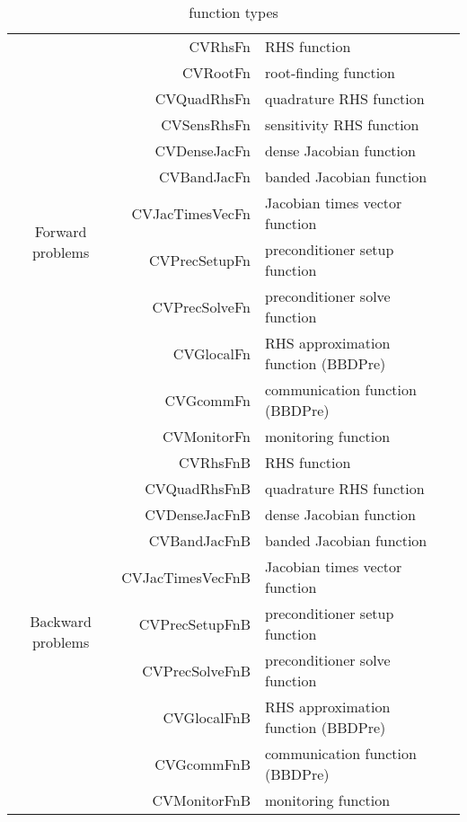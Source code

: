 \begin{table}[h]
\centering
\caption{{\cvodes} {\matlab} function types}
\label{t:cvodes_fct_types}
\medskip
\begin{tabular}{|c||r|l|r|}
  \hline
  \multirow{12}{*}{\begin{sideways} Forward problems \end{sideways}}
  &  CVRhsFn         &  RHS function & \pageref{p:CVRhsFn} \\
  &  CVRootFn        &  root-finding function  & \pageref{p:CVRootFn} \\
  &  CVQuadRhsFn     &  quadrature RHS function & \pageref{p:CVQuadRhsFn} \\
  &  CVSensRhsFn     &  sensitivity RHS function & \pageref{p:CVSensRhsFn} \\
  &  CVDenseJacFn    &  dense Jacobian function & \pageref{p:CVDenseJacFn} \\
  &  CVBandJacFn     &  banded Jacobian function & \pageref{p:CVBandJacFn} \\
  &  CVJacTimesVecFn &  Jacobian times vector function & \pageref{p:CVJacTimesVecFn} \\
  &  CVPrecSetupFn   &  preconditioner setup function & \pageref{p:CVPrecSetupFn} \\
  &  CVPrecSolveFn   &  preconditioner solve function & \pageref{p:CVPrecSolveFn} \\
  &  CVGlocalFn      &  RHS approximation function (BBDPre) & \pageref{p:CVGlocalFn} \\
  &  CVGcommFn       &  communication function (BBDPre) & \pageref{p:CVGcommFn} \\
  &  CVMonitorFn     &  monitoring function & \pageref{p:CVMonitorFn} \\
  \hline
  \multirow{10}{*}{\begin{sideways} Backward problems \end{sideways}}
  &  CVRhsFnB        &  RHS function & \pageref{p:CVRhsFnB} \\
  &  CVQuadRhsFnB    &  quadrature RHS function & \pageref{p:CVQuadRhsFnB} \\
  &  CVDenseJacFnB   &  dense Jacobian function & \pageref{p:CVDenseJacFnB} \\
  &  CVBandJacFnB    &  banded Jacobian function & \pageref{p:CVBandJacFnB} \\
  &  CVJacTimesVecFnB&  Jacobian times vector function & \pageref{p:CVJacTimesVecFnB} \\
  &  CVPrecSetupFnB  &  preconditioner setup function & \pageref{p:CVPrecSetupFnB} \\
  &  CVPrecSolveFnB  &  preconditioner solve function & \pageref{p:CVPrecSolveFnB} \\
  &  CVGlocalFnB     &  RHS approximation function (BBDPre) & \pageref{p:CVGlocalFnB} \\
  &  CVGcommFnB      &  communication function (BBDPre) & \pageref{p:CVGcommFnB} \\
  &  CVMonitorFnB    &  monitoring function & \pageref{p:CVMonitorFnB} \\
 \hline
\end{tabular}
\end{table}
